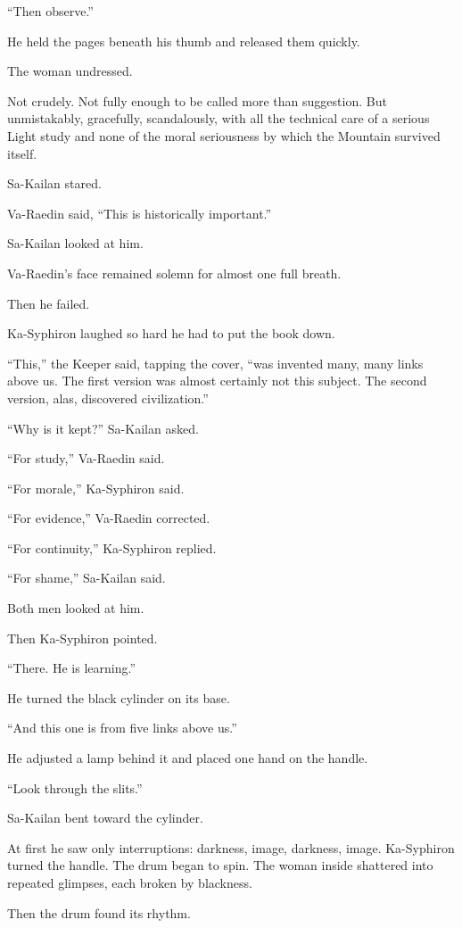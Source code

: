 “Then observe.”\par
He held the pages beneath his thumb and released them quickly.\par
The woman undressed.\par
Not crudely. Not fully enough to be called more than suggestion. But unmistakably, gracefully, scandalously, with all the technical care of a serious Light study and none of the moral seriousness by which the Mountain survived itself.\par
Sa-Kailan stared.\par
Va-Raedin said, “This is historically important.”\par
Sa-Kailan looked at him.\par
Va-Raedin’s face remained solemn for almost one full breath.\par
Then he failed.\par
Ka-Syphiron laughed so hard he had to put the book down.\par
“This,” the Keeper said, tapping the cover, “was invented many, many links above us. The first version was almost certainly not this subject. The second version, alas, discovered civilization.”\par
“Why is it kept?” Sa-Kailan asked.\par
“For study,” Va-Raedin said.\par
“For morale,” Ka-Syphiron said.\par
“For evidence,” Va-Raedin corrected.\par
“For continuity,” Ka-Syphiron replied.\par
“For shame,” Sa-Kailan said.\par
Both men looked at him.\par
Then Ka-Syphiron pointed.\par
“There. He is learning.”\par
He turned the black cylinder on its base.\par
“And this one is from five links above us.”\par
He adjusted a lamp behind it and placed one hand on the handle.\par
“Look through the slits.”\par
Sa-Kailan bent toward the cylinder.\par
At first he saw only interruptions: darkness, image, darkness, image. Ka-Syphiron turned the handle. The drum began to spin. The woman inside shattered into repeated glimpses, each broken by blackness.\par
Then the drum found its rhythm.\par
